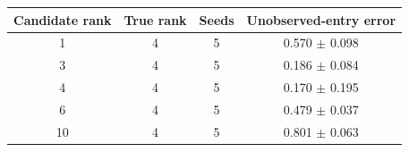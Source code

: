 \begin{tabular}{cccc}
\toprule
Candidate rank & True rank & Seeds & Unobserved-entry error \\
\midrule
1 & 4 & 5 & 0.570 $\pm$ 0.098 \\
3 & 4 & 5 & 0.186 $\pm$ 0.084 \\
4 & 4 & 5 & 0.170 $\pm$ 0.195 \\
6 & 4 & 5 & 0.479 $\pm$ 0.037 \\
10 & 4 & 5 & 0.801 $\pm$ 0.063 \\
\bottomrule
\end{tabular}
